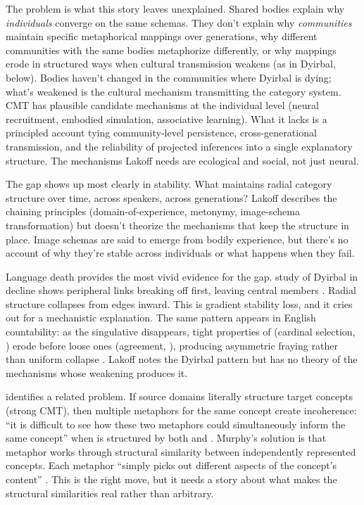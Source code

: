 \documentclass[12pt]{article}
\begin{document}
The problem is what this story leaves unexplained. Shared bodies explain why \emph{individuals} converge on the same schemas. They don't explain why \emph{communities} maintain specific metaphorical mappings over generations, why different communities with the same bodies metaphorize differently, or why mappings erode in structured ways when cultural transmission weakens (as in Dyirbal, below). Bodies haven't changed in the communities where Dyirbal is dying; what's weakened is the cultural mechanism transmitting the category system. CMT has plausible candidate mechanisms at the individual level (neural recruitment, embodied simulation, associative learning). What it lacks is a principled account tying community-level persistence, cross-generational transmission, and the reliability of projected inferences into a single explanatory structure. The mechanisms Lakoff needs are ecological and social, not just neural.

The gap shows up most clearly in stability. What maintains radial category structure over time, across speakers, across generations? Lakoff describes the chaining principles (domain-of-experience, metonymy, image-schema transformation) but doesn't theorize the mechanisms that keep the structure in place. Image schemas are said to emerge from bodily experience, but there's no account of why they're stable across individuals or what happens when they fail.

Language death provides the most vivid evidence for the gap.  study of Dyirbal in decline shows peripheral links breaking off first, leaving central members \citep[as discussed in][Ch.~6]{lakoff1987}. Radial structure collapses from edges inward. This is gradient stability loss, and it cries out for a mechanistic explanation. The same pattern appears in English countability: as the singulative  disappears, tight properties of  (cardinal selection, ) erode before loose ones (agreement, ), producing asymmetric fraying rather than uniform collapse \citep[Ch.~9]{reynolds2025hpcbook}. Lakoff notes the Dyirbal pattern but has no theory of the mechanisms whose weakening produces it.

\textcite{murphy1996} identifies a related problem. If source domains literally structure target concepts (strong CMT), then multiple metaphors for the same concept create incoherence: \enquote{it is difficult to see how these two metaphors could simultaneously inform the same concept} when  is structured by both  and  \citep[186]{murphy1996}. Murphy's solution is that metaphor works through structural similarity between independently represented concepts. Each metaphor \enquote{simply picks out different aspects of the concept's content} \citep[196]{murphy1996}. This is the right move, but it needs a story about what makes the structural similarities real rather than arbitrary.
\end{document}
